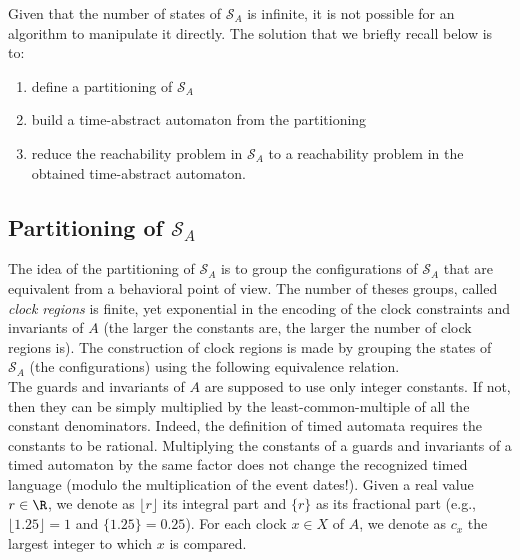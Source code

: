 Given that the number of states of $\mathcal{S}_A$ is infinite, it is not possible for an algorithm to manipulate it directly. The solution that we briefly recall below is to:
\begin{enumerate}

	\item define a partitioning of $\mathcal{S}_A$

	\item build a time-abstract automaton from the partitioning

	\item reduce the reachability problem in $\mathcal{S}_A$ to a reachability problem in the obtained time-abstract automaton.
\end{enumerate}


\subsection{Partitioning of $\mathcal{S}_A$}


The idea of the partitioning of $\mathcal{S}_A$ is to group the configurations of $\mathcal{S}_A$ that are equivalent from a behavioral point of view. The number of theses groups, called \emph{clock regions} is finite, yet exponential in the encoding of the clock constraints and invariants of $A$ (the larger the constants are, the larger the number of clock regions is). The construction of clock regions is made by grouping the states of $\mathcal{S}_A$ (the configurations) using the following equivalence relation.\\

The guards and invariants of $A$ are supposed to use only integer constants. If not, then they can be simply multiplied by the least-common-multiple of all the constant denominators. Indeed, the definition of timed automata requires the constants to be rational. Multiplying the constants of a guards and invariants of a timed automaton by the same factor does not change the recognized timed language (modulo the multiplication of the event dates!). Given a real value $r \in \R$, we denote as $\lfloor r \rfloor$ its integral part and $\{r\}$ as its fractional part (e.g., $\lfloor 1.25 \rfloor = 1$ and $\{1.25\} = 0.25$). For each clock $x \in X$ of $A$, we denote as $c_x$ the largest integer to which $x$ is compared.

